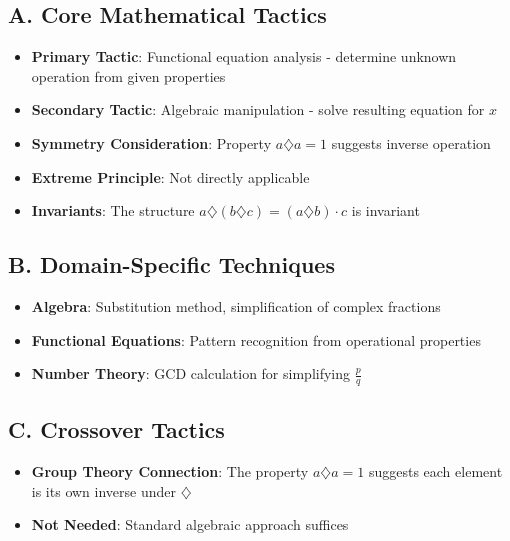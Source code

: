 \documentclass[11pt]{article}
\begin{document}
\begin{tacticalbox}
\subsection*{A. Core Mathematical Tactics}
\begin{itemize}[leftmargin=*]
    \item \textbf{Primary Tactic}: Functional equation analysis - determine unknown operation from given properties
    \item \textbf{Secondary Tactic}: Algebraic manipulation - solve resulting equation for $x$
    \item \textbf{Symmetry Consideration}: Property $a \diamondsuit a = 1$ suggests inverse operation
    \item \textbf{Extreme Principle}: Not directly applicable
    \item \textbf{Invariants}: The structure $a \diamondsuit (b \diamondsuit c) = (a \diamondsuit b) \cdot c$ is invariant
\end{itemize}

\subsection*{B. Domain-Specific Techniques}
\begin{itemize}[leftmargin=*]
    \item \textbf{Algebra}: Substitution method, simplification of complex fractions
    \item \textbf{Functional Equations}: Pattern recognition from operational properties
    \item \textbf{Number Theory}: GCD calculation for simplifying $\frac{p}{q}$
\end{itemize}

\subsection*{C. Crossover Tactics}
\begin{itemize}[leftmargin=*]
    \item \textbf{Group Theory Connection}: The property $a \diamondsuit a = 1$ suggests each element is its own inverse under $\diamondsuit$
    \item \textbf{Not Needed}: Standard algebraic approach suffices
\end{itemize}
\end{tacticalbox}
\end{document}
